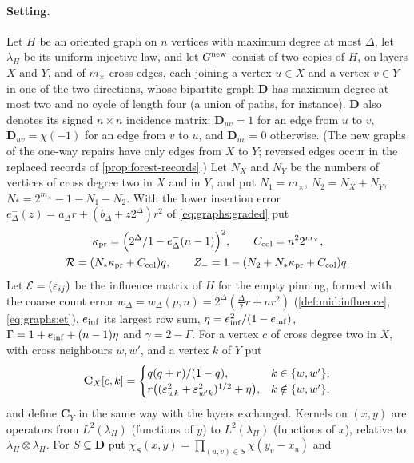 \paragraph{Setting.}
Let $H$ be an oriented graph on $n$ vertices with maximum degree at most
$\Delta$, let $\lambda_H$ be its uniform injective law, and let $G^{\rm new}$
consist of two copies of $H$, on layers $X$ and $Y$, and of $m_\times$ cross
edges, each joining a vertex $u\in X$ and a vertex $v\in Y$ in one of the two
directions, whose bipartite graph $\mathbf D$ has maximum degree at most two and
no cycle of length four (a union of paths, for instance). $\mathbf D$ also
denotes its signed $n\times n$ incidence matrix: $\mathbf D_{uv}=1$ for an edge
from $u$ to $v$, $\mathbf D_{uv}=\chi(-1)$ for an edge from $v$ to $u$, and
$\mathbf D_{uv}=0$ otherwise. (The new graphs of the one-way repairs have only
edges from $X$ to $Y$; reversed edges occur in the replaced records of
\cref{prop:forest-records}.) Let $N_X$ and $N_Y$ be the numbers of vertices of
cross degree two in $X$ and in $Y$, and put $N_1=m_\times$, $N_2=N_X+N_Y$,
$N_*=2^{m_\times}-1-N_1-N_2$. With the lower insertion error
$e^-_\Delta(z)=a_\Delta r+(b_\Delta+z2^\Delta)r^2$ of
\eqref{eq:graphs:graded} put
\begin{gather*}
 \kappa_{\rm pr}=\Bigl(\frac{2^\Delta}{1-e^-_\Delta(n-1)}\Bigr)^2,\qquad
 C_{\rm col}=n^22^{m_\times},\\
 \mathcal R=(N_*\kappa_{\rm pr}+C_{\rm col})q,\qquad
 Z_-=1-(N_2+N_*\kappa_{\rm pr}+C_{\rm col})q .
\end{gather*}
Let $\mathcal E=(\eps_{ij})$ be the influence matrix of $H$ for the empty
pinning, formed with the coarse count error
$w_\Delta=w_\Delta(p,n)=2^\Delta(\frac\Delta2r+nr^2)$ (\cref{def:mid:influence},
\eqref{eq:graphs:et}), $e_{\rm inf}$ its largest row sum,
$\eta=e_{\rm inf}^2/(1-e_{\rm inf})$, $\Gamma=1+e_{\rm inf}+(n-1)\eta$ and
$\gamma=2-\Gamma$. For a vertex $c$ of cross degree two in $X$, with cross
neighbours $w,w'$, and a vertex $k$ of $Y$ put
\[
 \mathbf C_X[c,k]=\begin{cases}q(q+r)/(1-q),&k\in\{w,w'\},\\
 r\bigl((\eps_{wk}^2+\eps_{w'k}^2)^{1/2}+\eta\bigr),&k\notin\{w,w'\},
 \end{cases}
\]
and define $\mathbf C_Y$ in the same way with the layers exchanged.
Kernels on $(x,y)$ are operators from $L^2(\lambda_H)$ (functions of $y$) to
$L^2(\lambda_H)$ (functions of $x$), relative to $\lambda_H\otimes\lambda_H$.
For $S\subseteq\mathbf D$ put $\chi_S(x,y)=\prod_{(u,v)\in S}\chi(y_v-x_u)$ and
